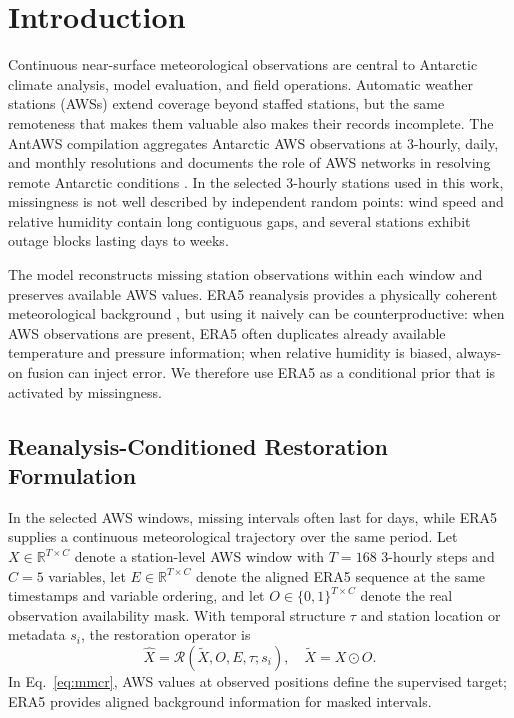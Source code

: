 \section{Introduction}

Continuous near-surface meteorological observations are central to Antarctic climate analysis, model evaluation, and field operations. Automatic weather stations (AWSs) extend coverage beyond staffed stations, but the same remoteness that makes them valuable also makes their records incomplete. The AntAWS compilation aggregates Antarctic AWS observations at 3-hourly, daily, and monthly resolutions and documents the role of AWS networks in resolving remote Antarctic conditions \citep{wang2023antaws}. In the selected 3-hourly stations used in this work, missingness is not well described by independent random points: wind speed and relative humidity contain long contiguous gaps, and several stations exhibit outage blocks lasting days to weeks.

The model reconstructs missing station observations within each window and preserves available AWS values. ERA5 reanalysis provides a physically coherent meteorological background \citep{hersbach2020era5}, but using it naively can be counterproductive: when AWS observations are present, ERA5 often duplicates already available temperature and pressure information; when relative humidity is biased, always-on fusion can inject error. We therefore use ERA5 as a conditional prior that is activated by missingness.

\subsection{Reanalysis-Conditioned Restoration Formulation}
In the selected AWS windows, missing intervals often last for days, while ERA5 supplies a continuous meteorological trajectory over the same period. Let $X \in \mathbb{R}^{T \times C}$ denote a station-level AWS window with $T=168$ 3-hourly steps and $C=5$ variables, let $E \in \mathbb{R}^{T \times C}$ denote the aligned ERA5 sequence at the same timestamps and variable ordering, and let $O \in \{0,1\}^{T \times C}$ denote the real observation availability mask. With temporal structure $\tau$ and station location or metadata $s_i$, the restoration operator is
\begin{equation}
\hat{X} = \mathcal{R}(\tilde{X}, O, E, \tau; s_i), \quad \tilde{X}=X\odot O.
\label{eq:mmcr}
\end{equation}
In Eq.~\ref{eq:mmcr}, AWS values at observed positions define the supervised target; ERA5 provides aligned background information for masked intervals.

